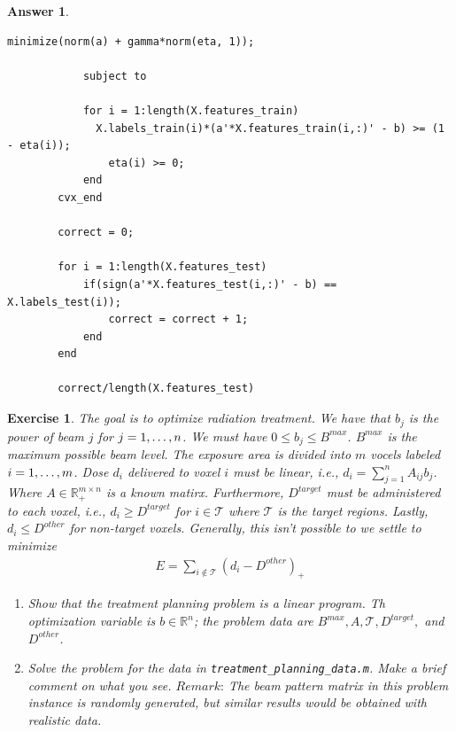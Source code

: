 \documentclass[12pt]{article}
\theoremstyle{colon}
\newtheorem{exercise}{Exercise}
\newtheorem*{answer}{Answer}
\begin{document}
\begin{answer}
\begin{enumerate}[label=\arabic*)]
\begin{lstlisting}[style=Matlab-editor, basicstyle=\scriptsize]
            minimize(norm(a) + gamma*norm(eta, 1));

            subject to

            for i = 1:length(X.features_train)
              X.labels_train(i)*(a'*X.features_train(i,:)' - b) >= (1 - eta(i));
                eta(i) >= 0;
            end
        cvx_end

        correct = 0;

        for i = 1:length(X.features_test)
            if(sign(a'*X.features_test(i,:)' - b) == X.labels_test(i));
                correct = correct + 1;
            end
        end

        correct/length(X.features_test)
      \end{lstlisting}
  \end{enumerate}
\end{answer}

\clearpage

\begin{exercise}
  The goal is to optimize radiation treatment. We have that $b_j$ is the power of beam $j$ for $j = 1, \mathellipsis, n$. We must have $0 \leq b_j \leq B^{max}$. $B^{max}$ is the maximum possible beam level. The exposure area is divided into $m$ vocels labeled $i = 1,\mathellipsis, m$. Dose $d_i$ delivered to voxel $i$ must be linear, i.e., $d_i = \sum_{j=1}^n A_{ij} b_j$. Where $A \in \mathbb{R}_+^{m \times n}$ is a known matirx. Furthermore, $D^{target}$ must be administered to each voxel, i.e., $d_i \geq D^{target}$ for $i \in \mathcal{T}$ where $\mathcal{T}$ is the target regions. Lastly, $d_i \leq D^{other}$ for non-target voxels. Generally, this isn't possible to we settle to minimize
  \begin{gather*}
    E = \sum_{i \notin \mathcal{T}} (d_i - D^{other})_+
  \end{gather*}
  \begin{enumerate}[label=\arabic*)]
    \item Show that the treatment planning problem is a linear program. Th optimization variable is $b \in \mathbb{R}^n$; the problem data are $B^{max}, A, \mathcal{T}, D^{target},$ and $D^{other}$.

    \item Solve the problem for the data in \texttt{treatment\_planning\_data.m}. Make a brief comment on what you see. $\textit{Remark:}$ The beam pattern matrix in this problem instance is randomly generated, but similar results would be obtained with realistic data.
  \end{enumerate}
\end{exercise}
\end{document}
